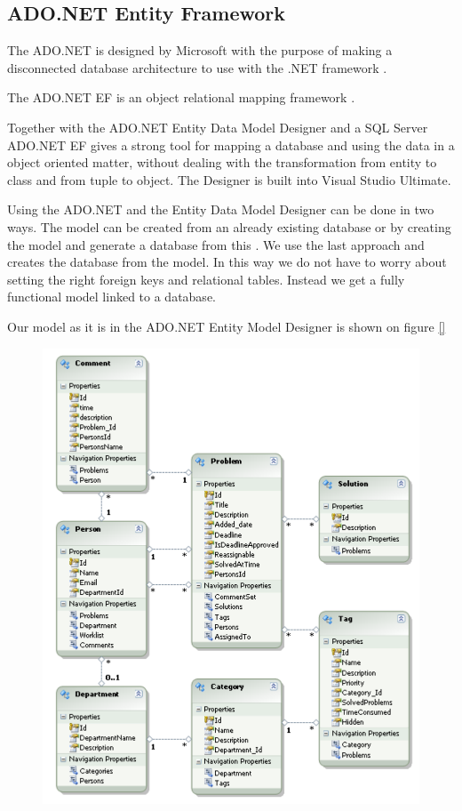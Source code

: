 \subsection{ADO.NET Entity Framework}
\label{sub:adonet}
The ADO.NET is designed by Microsoft with the purpose of making a disconnected database architecture to use with the .NET framework \cite{adonetDesignGoal}.

The ADO.NET EF is an object relational mapping framework \cite{adonetEntityFramework}.

Together with the ADO.NET Entity Data Model Designer and a SQL Server ADO.NET EF gives a strong tool for mapping a database and using the data in a object oriented matter, without dealing with the transformation from entity to class and from tuple to object. 
The Designer is built into Visual Studio Ultimate. 

Using the ADO.NET and the Entity Data Model Designer can be done in two ways. 
The  model can be created from an already existing database or by creating the model and generate a database from this \cite{adonetEntityDataModelDesigner}.
We use the last approach and creates the database from the model. 
In this way we do not have to worry about setting the right foreign keys and relational tables. Instead we get a fully functional model linked to a database. 

Our model as it is in the ADO.NET Entity Model Designer is shown on figure \ref{}
\begin{figure}
	\centering
		\includegraphics[scale=0.8]{input/implementation/mvc/Model.pdf}
	\label{fig:balanceWorkloadDiagram}
\end{figure}






